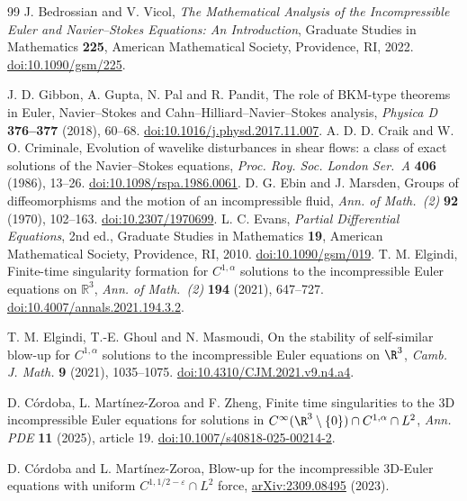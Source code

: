 \begin{thebibliography}{99}
 J. Bedrossian and V. Vicol,
\emph{The Mathematical Analysis of the Incompressible Euler and
Navier--Stokes Equations: An Introduction}, Graduate Studies in
Mathematics \textbf{225}, American Mathematical Society, Providence, RI, 2022.
\href{https://doi.org/10.1090/gsm/225}{doi:10.1090/gsm/225}.

 J. D. Gibbon, A. Gupta, N. Pal and R. Pandit,
The role of BKM-type theorems in Euler, Navier--Stokes and
Cahn--Hilliard--Navier--Stokes analysis, \emph{Physica D}
\textbf{376--377} (2018), 60--68.
\href{https://doi.org/10.1016/j.physd.2017.11.007}{doi:10.1016/j.physd.2017.11.007}.
 A. D. D. Craik and W. O. Criminale, Evolution of
wavelike disturbances in shear flows: a class of exact solutions of the
Navier--Stokes equations, \emph{Proc. Roy. Soc. London Ser.~A}
\textbf{406} (1986), 13--26.
\href{https://doi.org/10.1098/rspa.1986.0061}{doi:10.1098/rspa.1986.0061}.
 D. G. Ebin and J. Marsden, Groups of diffeomorphisms
and the motion of an incompressible fluid, \emph{Ann. of Math.~(2)} \textbf{92}
(1970), 102--163.
\href{https://doi.org/10.2307/1970699}{doi:10.2307/1970699}.
 L. C. Evans, \emph{Partial Differential Equations}, 2nd ed.,
Graduate Studies in Mathematics \textbf{19}, American Mathematical Society,
Providence, RI, 2010.
\href{https://doi.org/10.1090/gsm/019}{doi:10.1090/gsm/019}.
 T. M. Elgindi,
Finite-time singularity formation for $C^{1,\alpha}$ solutions to the
incompressible Euler equations on $\mathbb R^3$,
\emph{Ann. of Math.\ (2)} \textbf{194} (2021), 647--727.
\href{https://doi.org/10.4007/annals.2021.194.3.2}{doi:10.4007/annals.2021.194.3.2}.

T. M. Elgindi, T.-E. Ghoul and N. Masmoudi,
On the stability of self-similar blow-up for $C^{1,\alpha}$ solutions to the
incompressible Euler equations on $\R^3$,
\emph{Camb. J. Math.} \textbf{9} (2021), 1035--1075.
\href{https://doi.org/10.4310/CJM.2021.v9.n4.a4}{doi:10.4310/CJM.2021.v9.n4.a4}.

 D. C\'ordoba, L. Mart\'inez-Zoroa and F. Zheng,
Finite time singularities to the 3D incompressible Euler equations
for solutions in $C^\infty(\R^3\setminus\{0\})\cap C^{1,\alpha}\cap L^2$,
\emph{Ann. PDE} \textbf{11} (2025), article 19.
\href{https://doi.org/10.1007/s40818-025-00214-2}{doi:10.1007/s40818-025-00214-2}.

 D. C\'ordoba and L. Mart\'inez-Zoroa,
Blow-up for the incompressible 3D-Euler equations with uniform
$C^{1,1/2-\varepsilon}\cap L^2$ force,
\href{https://arxiv.org/abs/2309.08495}{arXiv:2309.08495} (2023).


\end{thebibliography}
